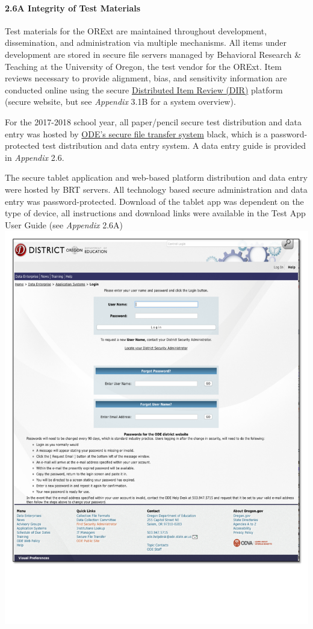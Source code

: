 \documentclass[]{article}
\let\oldparagraph\paragraph
\renewcommand{\paragraph}[1]{\oldparagraph{#1}\mbox{}}
\begin{document}
\paragraph{2.6A Integrity of Test
Materials}\label{a-integrity-of-test-materials}

Test materials for the ORExt are maintained throughout development,
dissemination, and administration via multiple mechanisms. All items
under development are stored in secure file servers managed by
Behavioral Research \& Teaching at the University of Oregon, the test
vendor for the ORExt. Item reviews necessary to provide alignment, bias,
and sensitivity information are conducted online using the secure
\color{link}\href{http://brtitemreview.com}{Distributed Item Review
(DIR)}\color{black} platform (secure website, but see \emph{Appendix}
3.1B for a system overview).

For the 2017-2018 school year, all paper/pencil secure test distribution
and data entry was hosted by
\color{link}\href{https://district.ode.state.or.us/apps/login/}{ODE's
secure file transfer system} \color
{black}, which is a password-protected test distribution and data entry
system. A data entry guide is provided in \emph{Appendix} 2.6.

The secure tablet application and web-based platform distribution and
data entry were hosted by BRT servers. All technology based secure
administration and data entry was password-protected. Download of the
tablet app was dependent on the type of device, all instructions and
download links were available in the Test App User Guide (see
\emph{Appendix} 2.6A) \FloatBarrier
\includegraphics{Figures/TrainingSite/SecureSite.pdf}
\end{document}
